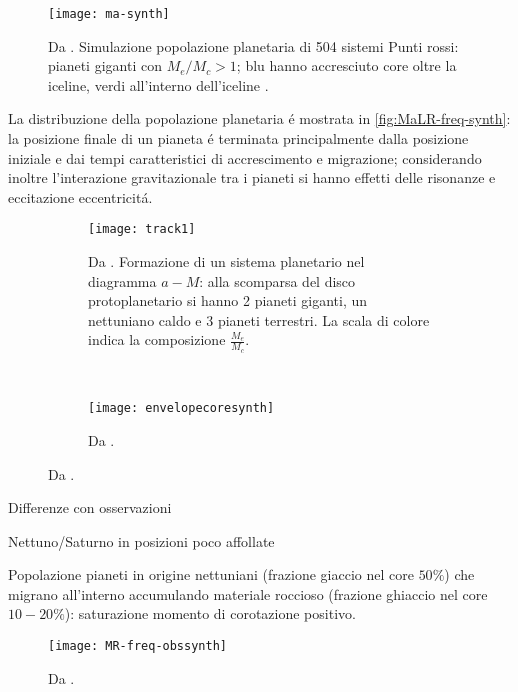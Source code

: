 \begin{workout}[Diagramma $(a-M)$]

\begin{figure}[!ht]
\texttt{[image: ma-synth]}
\caption{Da \cite{mordasini2018planetary}. Simulazione popolazione planetaria di 504 sistemi Punti rossi: pianeti giganti con $M_e/M_c>1$; blu hanno accresciuto core oltre la iceline, verdi all'interno dell'iceline .}
\end{figure}

La distribuzione della popolazione planetaria \'e mostrata in \ref{fig:MaLR-freq-synth}: la posizione finale di un pianeta \'e terminata principalmente dalla posizione iniziale e dai tempi caratteristici di accrescimento e migrazione; considerando inoltre l'interazione gravitazionale tra i pianeti si hanno effetti delle risonanze e eccitazione eccentricit\'a.

\begin{figure}[!ht]
\begin{subfigure}[b]{0.47\textwidth}
\centering
\texttt{[image: track1]}
\caption{Da \cite{mordasini2018planetary}. Formazione di un sistema planetario nel diagramma $a-M$: alla scomparsa del disco protoplanetario si hanno 2 pianeti giganti, un nettuniano caldo e 3 pianeti terrestri. La scala di colore indica la composizione $\frac{M_e}{M_c}$.}\label{fig:track1}
\end{subfigure}
~
\begin{subfigure}[b]{0.47\textwidth}
\centering
\texttt{[image: envelopecoresynth]}
\caption{Da \cite{mordasini2018planetary}. }
\end{subfigure}
\end{figure}

Differenze con osservazioni

Nettuno/Saturno in posizioni poco affollate

Popolazione pianeti in origine nettuniani (frazione giaccio nel core $50\%$) che migrano all'interno accumulando materiale roccioso (frazione ghiaccio nel core $10-20\%$): saturazione momento di corotazione positivo.

\end{workout}



\begin{figure}[!ht]\texttt{[image: MR-freq-obssynth]}\label{}\caption{Da \cite{mordasini2018pèlanetary}.}\end{figure}

